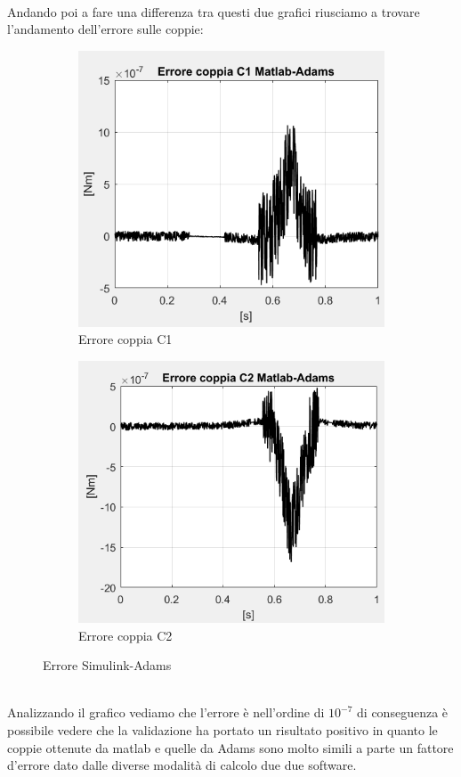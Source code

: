 \\Andando poi a fare una differenza tra questi due grafici riusciamo a trovare l'andamento dell'errore sulle coppie:
\begin{figure}[!ht]
	\begin{subfigure}{.5\textwidth}
		\centering
		\includegraphics[width=.9\linewidth]{Immagini/Dinamica/confrc1.png}  
		\caption{Errore coppia C1}
		\label{fig:errC1}
	\end{subfigure}
	\begin{subfigure}{.5\textwidth}
		\centering
		\includegraphics[width=.9\linewidth]{Immagini/Dinamica/confrc2.png}  
		\caption{Errore coppia C2}
		\label{fig:errC2}
	\end{subfigure}
	\caption{Errore Simulink-Adams}
\end{figure}
\\Analizzando il grafico vediamo che l'errore è nell'ordine di $10^{-7}$ di conseguenza è possibile vedere che la validazione ha portato un risultato positivo in quanto le coppie ottenute da matlab e quelle da Adams sono molto simili a parte un fattore d'errore dato dalle diverse modalità di calcolo due due software.

